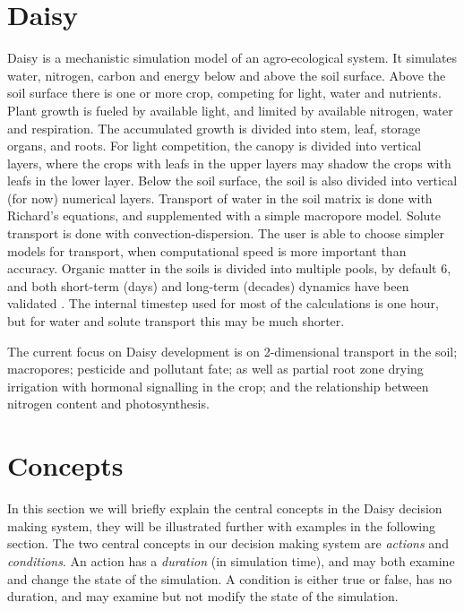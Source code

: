 \documentclass[a4paper]{article}
\begin{document}
\section{Daisy}

Daisy \cite{daisy-fertilizer,daisy-ems} is a mechanistic simulation
model of an agro-ecological system.  It simulates water, nitrogen,
carbon and energy below and above the soil surface.  Above the soil
surface there is one or more crop, competing for light, water and
nutrients.  Plant growth is fueled by available light, and limited by
available nitrogen, water and respiration.  The accumulated growth is
divided into stem, leaf, storage organs, and roots.  For light
competition, the canopy is divided into vertical layers, where the
crops with leafs in the upper layers may shadow the crops with leafs
in the lower layer.  Below the soil surface, the soil is also divided
into vertical (for now) numerical layers.  Transport of water in the
soil matrix is done with Richard's equations, and supplemented with a
simple macropore model.  Solute transport is done with
convection-dispersion.  The user is able to choose simpler models for
transport, when computational speed is more important than accuracy.
Organic matter in the soils is divided into multiple pools, by default
6, and both short-term (days) and long-term (decades) dynamics have
been validated
\cite{willigen91-compar,vereecken91-compar,diekkruger95-compar,smith97-compar,daisy-somnew}.
The internal timestep used for most of the calculations is one hour,
but for water and solute transport this may be much shorter.

The current focus on Daisy development is on 2-dimensional transport
in the soil; macropores; pesticide and pollutant fate; as well as
partial root zone drying irrigation with hormonal signalling in the
crop; and the relationship between nitrogen content and
photosynthesis.

\section{Concepts}

In this section we will briefly explain the central concepts in the
Daisy decision making system, they will be illustrated further with
examples in the following section.  The two central concepts in our
decision making system are \emph{actions} and \emph{conditions}.  An
action has a \emph{duration} (in simulation time), and may both
examine and change the state of the simulation.  A condition is either
true or false, has no duration, and may examine but not modify the
state of the simulation.
\end{document}
